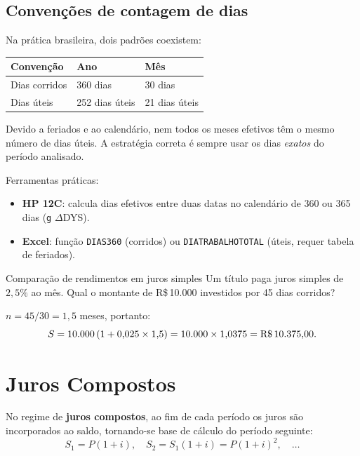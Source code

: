 \subsection*{Convenções de contagem de dias}

Na prática brasileira, dois padrões coexistem:

\begin{center}
\renewcommand{\arraystretch}{1.3}
\begin{tabular}{lll}
\toprule
\textbf{Convenção} & \textbf{Ano} & \textbf{Mês} \\
\midrule
Dias corridos & 360 dias & 30 dias \\
Dias úteis    & 252 dias úteis & 21 dias úteis \\
\bottomrule
\end{tabular}
\end{center}

\begin{nota}
Devido a feriados e ao calendário, nem todos os meses efetivos têm o mesmo número de dias úteis. A estratégia correta é sempre usar os dias \emph{exatos} do período analisado.

\smallskip
Ferramentas práticas:
\begin{itemize}[leftmargin=1.5em]
  \item \textbf{HP 12C}: calcula dias efetivos entre duas datas no calendário de 360 ou 365 dias (\texttt{g} $\Delta$DYS).
  \item \textbf{Excel}: função \texttt{DIAS360} (corridos) ou \texttt{DIATRABALHOTOTAL} (úteis, requer tabela de feriados).
\end{itemize}
\end{nota}

\begin{exemplo}{Comparação de rendimentos em juros simples}
Um título paga juros simples de $2{,}5\%$ ao mês. Qual o montante de R\$\,10.000 investidos por 45 dias corridos?

\medskip
$n = 45/30 = 1{,}5$ meses, portanto:
\[
  S = 10{.}000\,(1 + 0{,}025 \times 1{,}5) = 10{.}000 \times 1{,}0375 = \text{R\$\,}10.375{,}00.
\]
\end{exemplo}

\section{Juros Compostos}

No regime de \textbf{juros compostos}, ao fim de cada período os juros são incorporados ao saldo, tornando-se base de cálculo do período seguinte:
\[
  S_1 = P(1+i),\quad S_2 = S_1(1+i) = P(1+i)^2,\quad \ldots
\]

